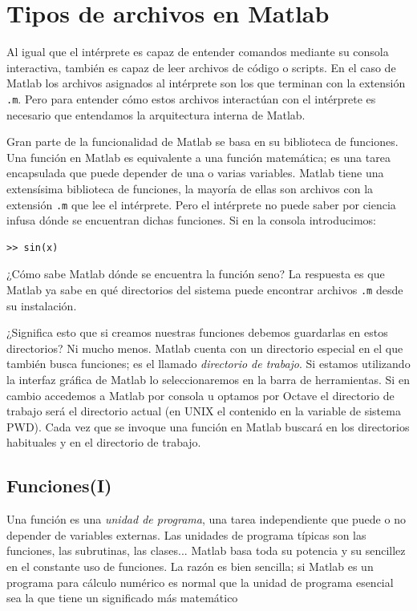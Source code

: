 \section{Tipos de archivos en Matlab}

Al igual que el intérprete es capaz de entender comandos mediante su
consola interactiva, también es capaz de leer archivos de código o
scripts. En el caso de Matlab los archivos asignados al intérprete
son los que terminan con la extensión \texttt{.m}. Pero para entender
cómo estos archivos interactúan con el intérprete es necesario 
que entendamos la arquitectura interna de Matlab.

Gran parte de la funcionalidad de Matlab se basa en su biblioteca de
funciones.  Una función en Matlab es equivalente a una función
matemática; es una tarea encapsulada que puede depender de una o
varias variables.  Matlab tiene una extensísima biblioteca de funciones, 
la mayoría de ellas son archivos con la extensión \texttt{.m} que
lee el intérprete.  Pero el intérprete no puede saber por ciencia infusa
dónde se encuentran dichas funciones.  Si en la consola introducimos:
\begin{lstlisting}
>> sin(x)
\end{lstlisting}
¿Cómo sabe Matlab dónde se encuentra la función seno?  La respuesta es
que Matlab ya sabe en qué directorios del sistema puede encontrar
archivos \texttt{.m} desde su instalación.

¿Significa esto que si creamos nuestras funciones debemos guardarlas
en estos directorios?  Ni mucho menos.  Matlab cuenta con un directorio
especial en el que también busca funciones; es el llamado \emph{directorio
de trabajo}.  Si estamos utilizando la interfaz gráfica de Matlab lo
seleccionaremos en la barra de herramientas.  Si en cambio accedemos 
a Matlab por consola u optamos por Octave el directorio de trabajo
será el directorio actual (en UNIX el contenido en la variable de
sistema PWD).  Cada vez que se invoque una función en Matlab buscará
en los directorios habituales y en el directorio de trabajo.

\subsection{Funciones(I)\label{sub:Funciones(I)}}

Una función es una \emph{unidad de programa}, una tarea
independiente que puede o no depender de variables externas.  Las unidades
de programa típicas son las funciones, las subrutinas, las clases...
Matlab basa toda su potencia y su sencillez en el constante uso de
funciones.  La razón es bien sencilla; si Matlab es un programa para
cálculo numérico es normal que la unidad de programa esencial sea
la que tiene un significado más matemático

